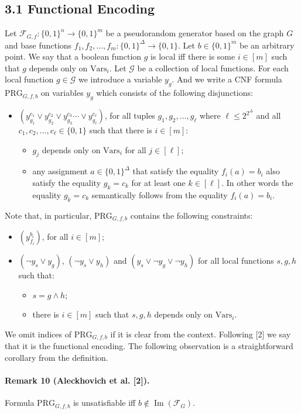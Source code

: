 \subsection*{3.1 Functional Encoding}
Let $\mathcal F_{G,f}:\{0,1\}^n\to\{0,1\}^m$ be a pseudorandom generator based on the graph $G$ and base functions $f_1,f_2,\ldots,f_m:\{0,1\}^\Delta\to\{0,1\}$. Let $b\in\{0,1\}^m$ be an arbitrary point. We say that a boolean function $g$ is local iff there is some $i\in[m]$ such that $g$ depends only on $\mathrm{Vars}_i$. Let $\mathcal G$ be a collection of local functions.
For each local function $g\in\mathcal G$ we introduce a variable $y_g$. And we write a CNF formula $\mathrm{PRG}_{G,f,b}$ on variables $y_g$ which consists of the following disjunctions:
\begin{itemize}
\item $(y_{g_1}^{c_1}\vee y_{g_2}^{c_2}\vee y_{g_3}^{c_3}\cdots\vee y_{g_\ell}^{c_\ell})$, for all tuples $g_1,g_2,\ldots,g_\ell$ where $\ell\leq2^{2^\Delta}$ and all $c_1,c_2,\ldots,c_\ell\in\{0,1\}$ such that there is $i\in[m]$:
\begin{itemize}
\item $g_j$ depends only on $\mathrm{Vars}_i$ for all $j\in[\ell]$;
\item any assignment $a\in\{0,1\}^\Delta$ that satisfy the equality $f_i(a)=b_i$ also satisfy the equality $g_k=c_k$ for at least one $k\in[\ell]$. In other words the equality $g_k=c_k$ semantically follows from the equality $f_i(a)=b_i$.
\end{itemize}
\end{itemize}
Note that, in particular, $\mathrm{PRG}_{G,f,b}$ contains the following constraints:
\begin{itemize}
\item $(y_{f_i}^{b_i})$, for all $i\in[m]$;
\item $(\neg y_s\vee y_g)$, $(\neg y_s\vee y_h)$ and $(y_s\vee\neg y_g\vee\neg y_h)$ for all local functions $s,g,h$ such that:
\begin{itemize}
\item $s=g\wedge h$;
\item there is $i\in[m]$ such that $s,g,h$ depends only on $\mathrm{Vars}_i$.
\end{itemize}
\end{itemize}
We omit indices of $\mathrm{PRG}_{G,f,b}$ if it is clear from the context. Following [2] we say that it is the functional encoding. The following observation is a straightforward corollary from the definition.
\paragraph{Remark 10 (Aleckhovich et al. [2]).} Formula $\mathrm{PRG}_{G,f,b}$ is unsatisfiable iff $b\notin\operatorname{Im}(\mathcal F_G)$.
